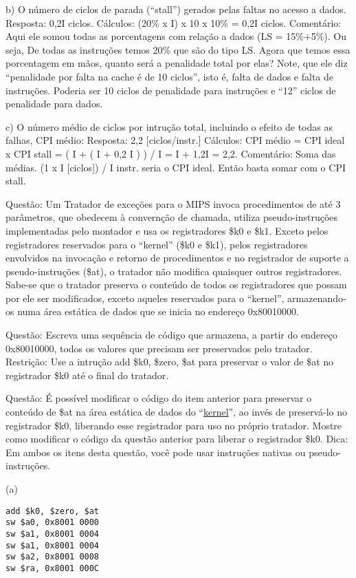 \documentclass{article}
\begin{document}
b) O número de ciclos de parada (“stall”) gerados pelas faltas no acesso a
dados. Resposta: 0,2I ciclos. Cálculos: (20\% x I) x 10 x 10\% = 0,2I ciclos.
Comentário: Aqui ele somou todas as porcentagens com relação a dados (LS =
15\%+5\%). Ou seja, De todas as instruções temos 20\% que são do tipo LS. Agora
que temos essa porcentagem em mãos, quanto será a penalidade total por elas?
Note, que ele diz “penalidade por falta na cache é de 10 ciclos”, isto é, falta
de dados e falta de instruções. Poderia ser 10 ciclos de penalidade para
instruções e “12” ciclos de penalidade para dados.

c) O número médio de ciclos por intrução total, incluindo o efeito de todas as
falhas, CPI médio: Resposta: 2,2 [ciclos/instr.] Cálculos: CPI médio = CPI ideal
x CPI stall = ( I + ( I + 0,2 I ) ) / I = I + 1,2I = 2,2. Comentário: Soma das
médias. (1 x I [ciclos]) / I instr. seria o CPI ideal. Então basta somar com o
CPI stall.

Questão: Um Tratador de exceções para o MIPS invoca procedimentos de até 3
parâmetros, que obedecem à convernção de chamada, utiliza pseudo-instruções
implementadas pelo montador e usa os registradores \$k0 e \$k1. Exceto pelos
registradores reservados para o “kernel” (\$k0 e \$k1), pelos registradores
envolvidos na invocação e retorno de procedimentos e no registrador de suporte
a pseudo-instruções (\$at), o tratador não modifica quaisquer outros
registradores. Sabe-se que o tratador preserva o conteúdo de todos os
registradores que possam por ele ser modificados, exceto aqueles reservados
para o “kernel”, armazenando-os numa área estática de dados que se inicia no
endereço 0x80010000.

Questão: Escreva uma sequência de código que armazena, a partir do endereço
0x80010000, todos os valores que precisam ser preservados pelo tratador.
Restrição: Use a intrução add \$k0, \$zero, \$at para preservar o valor de \$at
no registrador \$k0 até o final do tratador.

Questão: É possível modificar o código do item anterior para preservar o
conteúdo de \$at na área estática de dados do “\underline{kernel}”, ao invés de
preservá-lo no registrador \$k0, liberando esse registrador para uso no próprio
tratador. Mostre como modificar o código da questão anterior para liberar o
registrador \$k0. Dica: Em ambos os itens desta questão, você pode usar
instruções nativas ou pseudo-instruções.

(a)
\begin{verbatim}
add $k0, $zero, $at
sw $a0, 0x8001 0000
sw $a1, 0x8001 0004
sw $a1, 0x8001 0004
sw $a2, 0x8001 0008
sw $ra, 0x8001 000C
\end{verbatim}
\end{document}
